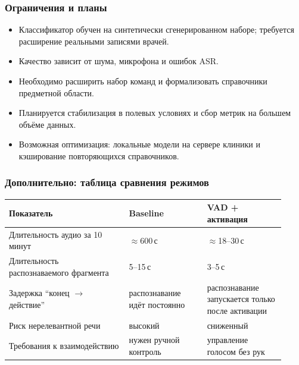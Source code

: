 \documentclass{beamer}
\begin{document}
\begin{frame}
  \frametitle{Ограничения и планы}
  \begin{itemize}
    \item Классификатор обучен на синтетически сгенерированном наборе; требуется расширение реальными записями врачей.
    \item Качество зависит от шума, микрофона и ошибок ASR.
    \item Необходимо расширить набор команд и формализовать справочники предметной области.
    \item Планируется стабилизация в полевых условиях и сбор метрик на большем объёме данных.
    \item Возможная оптимизация: локальные модели на сервере клиники и кэширование повторяющихся справочников.
  \end{itemize}
\end{frame}

\appendix
\begin{frame}
  \frametitle{Дополнительно: таблица сравнения режимов}
  \scriptsize
  \begin{tabular}{|p{0.40\linewidth}|p{0.26\linewidth}|p{0.26\linewidth}|}
  \hline
  \textbf{Показатель} & \textbf{Baseline} & \textbf{VAD + активация} \\
  \hline
  Длительность аудио за 10 минут & $\approx$600\,с & $\approx$18--30\,с \\
  \hline
  Длительность распознаваемого фрагмента & 5--15\,с & 3--5\,с \\
  \hline
  Задержка \enquote{конец $\rightarrow$ действие} & распознавание идёт постоянно & распознавание запускается только после активации \\
  \hline
  Риск нерелевантной речи & высокий & сниженный \\
  \hline
  Требования к взаимодействию & нужен ручной контроль & управление голосом без рук \\
  \hline
  \end{tabular}
\end{frame}
\end{document}
